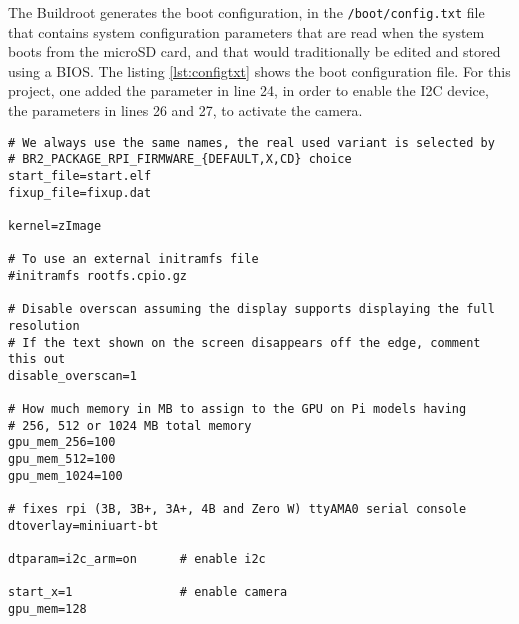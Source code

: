 The Buildroot generates the boot configuration, in the \verb|/boot/config.txt| file that contains system configuration parameters that are read when the system boots from the microSD card, and that would traditionally be edited and stored using a BIOS. \cite{configtxt} The listing \ref{lst:configtxt} shows the boot configuration file. For this project, one added the parameter in line 24, in order to enable the I2C device, the parameters in lines 26 and 27, to activate the camera.

\begin{lstlisting}[caption={/boot/config.txt file.}, label={lst:configtxt}]
# We always use the same names, the real used variant is selected by
# BR2_PACKAGE_RPI_FIRMWARE_{DEFAULT,X,CD} choice
start_file=start.elf
fixup_file=fixup.dat

kernel=zImage

# To use an external initramfs file
#initramfs rootfs.cpio.gz

# Disable overscan assuming the display supports displaying the full resolution
# If the text shown on the screen disappears off the edge, comment this out
disable_overscan=1

# How much memory in MB to assign to the GPU on Pi models having
# 256, 512 or 1024 MB total memory
gpu_mem_256=100
gpu_mem_512=100
gpu_mem_1024=100

# fixes rpi (3B, 3B+, 3A+, 4B and Zero W) ttyAMA0 serial console
dtoverlay=miniuart-bt

dtparam=i2c_arm=on 		# enable i2c

start_x=1             	# enable camera
gpu_mem=128           
\end{lstlisting}
